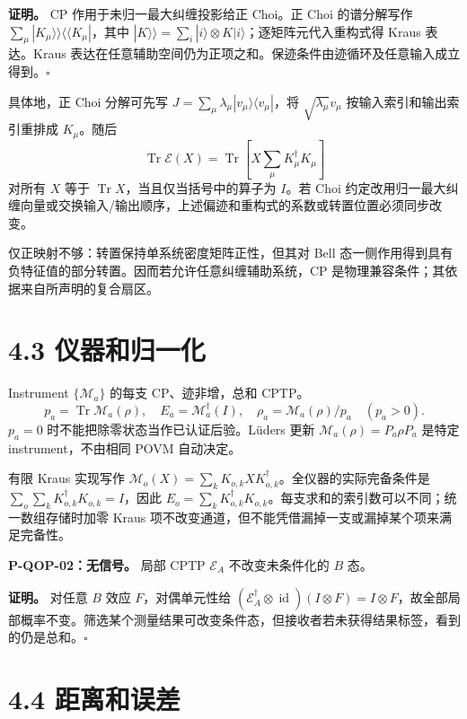 \documentclass[
  11pt,
  oneside]{book}
\begin{document}
\textbf{证明。} CP 作用于未归一最大纠缠投影给正 Choi。正 Choi
的谱分解写作 \(\sum_\mu|K_\mu\rangle\rangle\langle\langle K_\mu|\)，其中
\(|K\rangle\rangle=\sum_i|i\rangle\otimes K|i\rangle\)；逐矩阵元代入重构式得
Kraus 表达。Kraus
表达在任意辅助空间仍为正项之和。保迹条件由迹循环及任意输入成立得到。\(\square\)

具体地，正 Choi 分解可先写
\(J=\sum_\mu\lambda_\mu|v_\mu\rangle\langle v_\mu|\)，将
\(\sqrt{\lambda_\mu}v_\mu\) 按输入索引和输出索引重排成 \(K_\mu\)。随后
\[
\operatorname{Tr}\mathcal E(X)
=\operatorname{Tr}\left[X\sum_\mu K_\mu^\dagger K_\mu\right]
\] 对所有 \(X\) 等于 \(\operatorname{Tr}X\)，当且仅当括号中的算子为
\(I\)。若 Choi
约定改用归一最大纠缠向量或交换输入/输出顺序，上述偏迹和重构式的系数或转置位置必须同步改变。

仅正映射不够：转置保持单系统密度矩阵正性，但其对 Bell
态一侧作用得到具有负特征值的部分转置。因而若允许任意纠缠辅助系统，CP
是物理兼容条件；其依据来自所声明的复合扇区。

\hypertarget{ux4eeaux5668ux548cux5f52ux4e00ux5316}{%
\section{4.3 仪器和归一化}\label{ux4eeaux5668ux548cux5f52ux4e00ux5316}}

Instrument \(\{\mathcal M_a\}\) 的每支 CP、迹非增，总和 CPTP。 \[
p_a=\operatorname{Tr}\mathcal M_a(\rho),\quad
E_a=\mathcal M_a^\dagger(I),\quad
\rho_a=\mathcal M_a(\rho)/p_a\quad(p_a>0).
\] \(p_a=0\) 时不能把除零状态当作已认证后验。Lüders 更新
\(\mathcal M_a(\rho)=P_a\rho P_a\) 是特定 instrument，不由相同 POVM
自动决定。

有限 Kraus 实现写作
\(\mathcal M_o(X)=\sum_kK_{o,k}XK_{o,k}^\dagger\)。全仪器的实际完备条件是
\(\sum_o\sum_kK_{o,k}^\dagger K_{o,k}=I\)，因此
\(E_o=\sum_kK_{o,k}^\dagger K_{o,k}\)。每支求和的索引数可以不同；统一数组存储时加零
Kraus 项不改变通道，但不能凭借漏掉一支或漏掉某个项来满足完备性。

\protect\hypertarget{p-qop-02}{}{}

\textbf{P-QOP-02：无信号。} 局部 CPTP \(\mathcal E_A\) 不改变未条件化的
\(B\) 态。

\textbf{证明。} 对任意 \(B\) 效应 \(F\)，对偶单元性给
\((\mathcal E_A^\dagger\otimes\operatorname{id})(I\otimes F)=I\otimes F\)，故全部局部概率不变。筛选某个测量结果可改变条件态，但接收者若未获得结果标签，看到的仍是总和。\(\square\)

\hypertarget{ux8dddux79bbux548cux8befux5dee}{%
\section{4.4 距离和误差}\label{ux8dddux79bbux548cux8befux5dee}}
\end{document}
